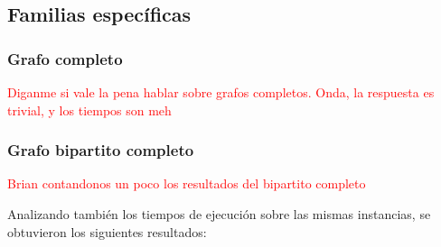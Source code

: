 \subsection{Familias específicas}
\subsubsection{Grafo completo}

\textcolor{red}{Diganme si vale la pena hablar sobre grafos completos. Onda, la respuesta es trivial, y los tiempos son meh}

\subsubsection{Grafo bipartito completo}

\textcolor{red}{Brian contandonos un poco los resultados del bipartito completo}

Analizando también los tiempos de ejecución sobre las mismas instancias, se obtuvieron los siguientes resultados:

